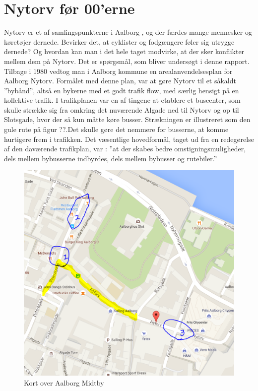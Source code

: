 \section{Nytorv før 00'erne}
\label{sec:nytorv_foer_null}
Nytorv er et af samlingspunkterne i Aalborg , og der færdes mange mennesker og køretøjer dernede. Bevirker det, at cyklister og fodgængere føler sig utrygge dernede? Og hvordan kan man i det hele taget modvirke, at der sker konflikter mellem dem på Nytorv. Det er spørgsmål, som bliver undersøgt i denne rapport.
Tilbage i 1980 vedtog man i Aalborg kommune en arealanvendelsesplan for Aalborg Nytorv. \autocite{Madsen2010}
Formålet med denne plan, var at gøre Nytorv til et såkaldt ”bybånd”, altså en bykerne med et godt trafik flow, med særlig hensigt på en kollektive trafik. I trafikplanen var en af tingene at etablere et buscenter, som skulle strække sig fra omkring det nuværende Algade ned til Nytorv og op til Slotsgade, hvor der så kun måtte køre busser. Strækningen er illustreret som den gule rute på figur ??.Det skulle gøre det nemmere for busserne, at komme hurtigere frem i trafikken. Det  væsentlige hovedformål, taget ud fra en redegørelse af den daværende trafikplan, var :
”at der skabes bedre omstigningsmuligheder, dels mellem bybusserne     indbyrdes, dels mellem bybusser og rutebiler.”
\begin{figure}
\centering
\includegraphics[scale=0.5]{figures/Billederogfigur/opserveringspunkter2.PNG}
\caption{Kort over Aalborg Midtby}
\end{figure}
